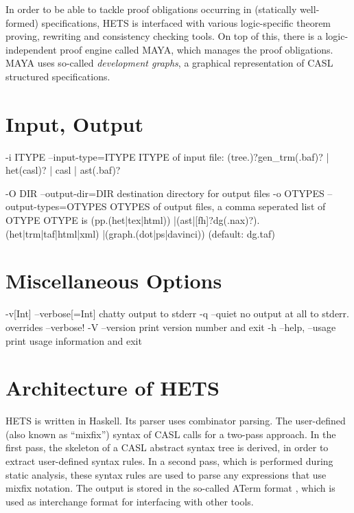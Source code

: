 \documentclass{article}
\newcommand{\normalTEXTSC}[2]{{#1\scriptsize#2}}
\newcommand     {\CASL}{\normalTEXTSC{C}{ASL}\xspace}
\newcommand     {\MAYA}{\normalTEXTSC{M}{AYA}\xspace}
\newcommand     {\Hets}{\normalTEXTSC{H}{ETS}\xspace}
\begin{document}
In order to be able to tackle proof
obligations occurring in (statically well-formed) specifications, \Hets
is interfaced with various logic-specific theorem proving, rewriting
and consistency checking tools.  On top of this, there is a
logic-independent proof engine called \MAYA, which manages the proof
obligations. \MAYA uses so-called \emph{development graphs}, a
graphical representation of \CASL structured specifications.


\section{Input, Output}

  -i ITYPE   --input-type=ITYPE     ITYPE of input file:
        (tree.)?gen_trm(.baf)? | het(casl)? | casl | ast(.baf)?

  -O DIR     --output-dir=DIR       destination directory for output files
  -o OTYPES  --output-types=OTYPES  OTYPES of output files, a comma seperated list of OTYPE
        OTYPE is (pp.(het|tex|html))
                |(ast|[fh]?dg(.nax)?).(het|trm|taf|html|xml)
                |(graph.(dot|ps|davinci))
                (default: dg.taf)

\section{Miscellaneous Options}
  -v[Int]    --verbose[=Int]        chatty output to stderr
  -q         --quiet                no output at all to stderr. overrides --verbose!
  -V         --version              print version number and exit
  -h         --help, --usage        print usage information and exit


\section{Architecture of \Hets}

\Hets is written in Haskell. Its parser uses combinator 
parsing.
The user-defined (also known as ``mixfix'') syntax of \CASL
calls for a two-pass approach. In the first pass, the skeleton of a
\CASL abstract syntax tree is derived, in order to extract user-defined 
syntax rules. In a second pass, which is performed during 
static
analysis, these syntax rules are used to parse 
any expressions that
use mixfix notation. The output is stored in the so-called
ATerm format \cite{BJKO00}, which is used as interchange format
for interfacing with other tools.
\end{document}
